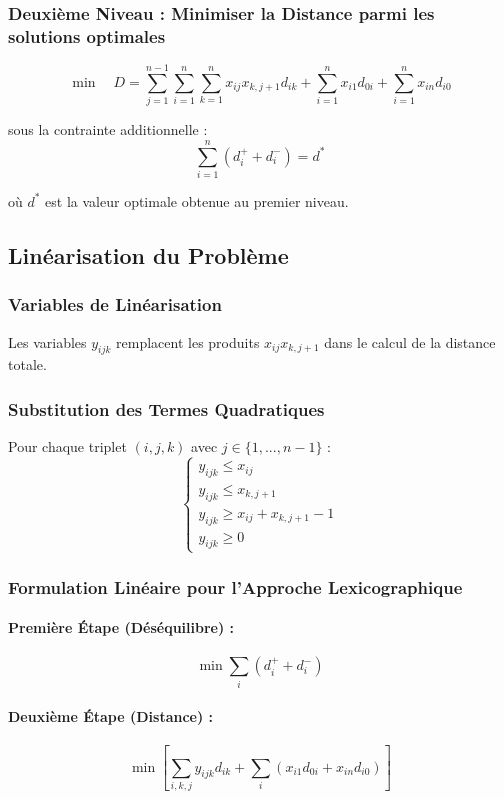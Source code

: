 \documentclass{article}
\begin{document}
\subsubsection{Deuxième Niveau : Minimiser la Distance parmi les solutions optimales}
\[
\min \quad D = \sum_{j=1}^{n-1} \sum_{i=1}^n \sum_{k=1}^n x_{ij} x_{k,j+1} d_{ik} + \sum_{i=1}^n x_{i1} d_{0i} + \sum_{i=1}^n x_{in} d_{i0}
\]

sous la contrainte additionnelle :
\[
\sum_{i=1}^n (d_i^+ + d_i^-) = d^*
\]

où $d^*$ est la valeur optimale obtenue au premier niveau.

\subsection{Linéarisation du Problème}
\subsubsection{Variables de Linéarisation}
Les variables $y_{ijk}$ remplacent les produits $x_{ij}x_{k,j+1}$ dans le calcul de la distance totale.

\subsubsection{Substitution des Termes Quadratiques}
Pour chaque triplet $(i,j,k)$ avec $j \in \{1,...,n-1\}$ :
\[
\begin{cases}
y_{ijk} \leq x_{ij} \\
y_{ijk} \leq x_{k,j+1} \\
y_{ijk} \geq x_{ij} + x_{k,j+1} - 1 \\
y_{ijk} \geq 0
\end{cases}
\]

\subsubsection{Formulation Linéaire pour l'Approche Lexicographique}
\paragraph{Première Étape (Déséquilibre) :}
\[
\min \sum_i (d_i^+ + d_i^-)
\]

\paragraph{Deuxième Étape (Distance) :}
\[
\min \left[\sum_{i,k,j} y_{ijk} d_{ik} + \sum_i (x_{i1} d_{0i} + x_{in} d_{i0})\right]
\]
\end{document}
